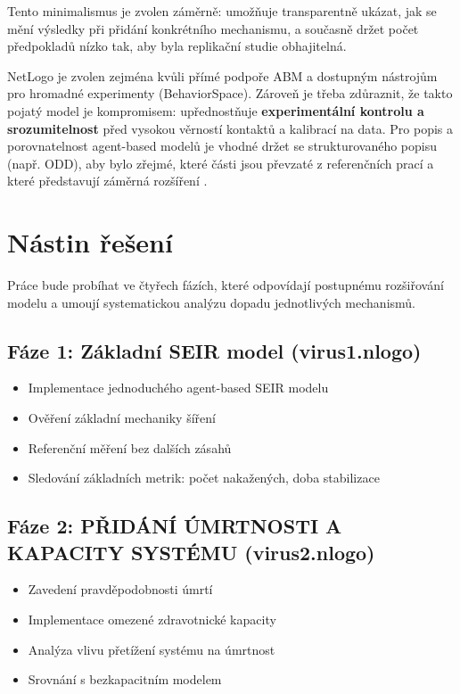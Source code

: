 \documentclass{article}
\begin{document}
Tento minimalismus je zvolen záměrně: umožňuje transparentně ukázat, jak se mění výsledky při přidání konkrétního mechanismu, a současně držet počet předpokladů nízko tak, aby byla replikační studie obhajitelná.

NetLogo je zvolen zejména kvůli přímé podpoře ABM a dostupným nástrojům pro hromadné experimenty (BehaviorSpace). Zároveň je třeba zdůraznit, že takto pojatý model je kompromisem: upřednostňuje \textbf{experimentální kontrolu a srozumitelnost} před vysokou věrností kontaktů a kalibrací na data. Pro popis a porovnatelnost agent-based modelů je vhodné držet se strukturovaného popisu (např. ODD), aby bylo zřejmé, které části jsou převzaté z referenčních prací a které představují záměrná rozšíření \cite{grimm-2010-odd-update}.


\section{Nástin řešení}

Práce bude probíhat ve čtyřech fázích, které odpovídají postupnému rozšiřování modelu a umoují systematickou analýzu dopadu jednotlivých mechanismů.

\subsection{Fáze 1: Základní SEIR model (virus1.nlogo)}
\begin{itemize}
\item Implementace jednoduchého agent-based SEIR modelu
\item Ověření základní mechaniky šíření
\item Referenční měření bez dalších zásahů
\item Sledování základních metrik: počet nakažených, doba stabilizace
\end{itemize}

\subsection{Fáze 2: PŘIDÁNÍ ÚMRTNOSTI A KAPACITY SYSTÉMU (virus2.nlogo)}
\begin{itemize}
\item Zavedení pravděpodobnosti úmrtí
\item Implementace omezené zdravotnické kapacity
\item Analýza vlivu přetížení systému na úmrtnost
\item Srovnání s bezkapacitním modelem
\end{itemize}
\end{document}
